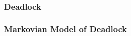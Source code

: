 \documentclass[xcolor={table}]{beamer}
\begin{document}
\begin{frame}
    \frametitle{Deadlock}
    \begin{figure}
    
    \end{figure}
\end{frame}

\begin{frame}
    \begin{figure}
    
    \end{figure}
\end{frame}

\begin{frame}
    \frametitle{Markovian Model of Deadlock}
    \newline
\end{frame}
\end{document}
